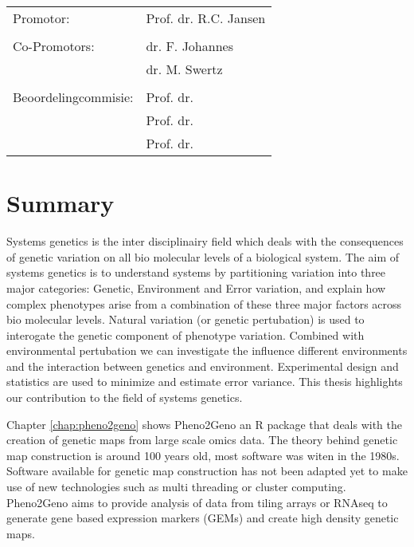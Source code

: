 \documentclass[8pt, twoside]{book}
\begin{document}
\newpage
\thispagestyle{empty}
\begin{tabular}{ l l }
Promotor:             & Prof. dr. R.C. Jansen \\
                      & \\
Co-Promotors:         & dr. F. Johannes \\
                      & dr. M. Swertz \\
                      & \\
Beoordelingcommisie:  & Prof. dr. \\
                      & Prof. dr. \\
                      & Prof. dr. \\
\end{tabular}
\tableofcontents

\newpage
\thispagestyle{empty}
\chapter*{Summary}\vspace{-30pt}
Systems genetics is the inter disciplinairy field which deals with the consequences of genetic 
variation on all bio molecular levels of a biological system. The aim of systems genetics is to 
understand systems by partitioning variation into three major categories: Genetic, Environment 
and Error variation, and explain how complex phenotypes arise from a combination of these three 
major factors across bio molecular levels.  Natural variation (or genetic pertubation) is used 
to interogate the genetic component of phenotype variation. Combined with environmental 
pertubation we can investigate the influence different environments and the interaction between 
genetics and environment. Experimental design and statistics are used to minimize and estimate 
error variance. This thesis highlights our contribution to the field of systems genetics.

Chapter \ref{chap:pheno2geno} shows Pheno2Geno an R package that deals with the creation of 
genetic maps from large scale omics data. The theory behind genetic map construction is around 
100 years old, most software was witen in the 1980s. Software available for genetic map construction 
has not been adapted yet to make use of new technologies such as multi threading or cluster 
computing. Pheno2Geno aims to provide analysis of data from tiling arrays or RNAseq to generate 
gene based expression markers (GEMs) and create high density genetic maps.
\end{document}
